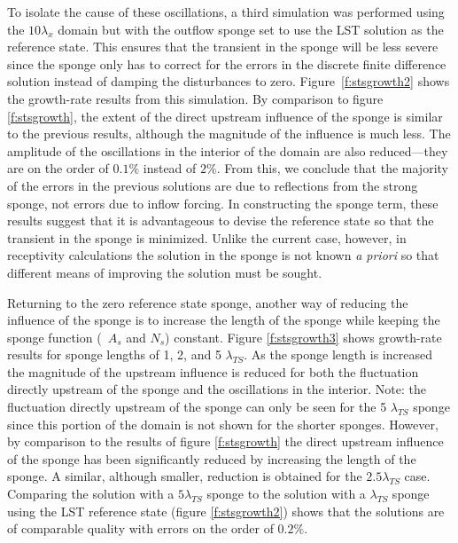 To isolate the cause of these oscillations, a third simulation was performed
using the $10 \lambda_x$ domain but with the outflow sponge set to use the LST
solution as the reference state.  This ensures that the transient in the
sponge will be less severe since the sponge only has to correct for the errors
in the discrete finite difference solution instead of damping the disturbances
to zero.  Figure~\ref{f:stsgrowth2} shows the growth-rate results from this
simulation.  By comparison to figure \ref{f:stsgrowth}, the extent of the
direct upstream influence of the sponge is similar to the previous results,
although the magnitude of the influence is much less.  The amplitude of the
oscillations in the interior of the domain are also reduced---they are on the
order of $0.1\%$ instead of $2\%$.  From this, we conclude that the majority
of the errors in the previous solutions are due to reflections from the strong
sponge, not errors due to inflow forcing.  In constructing the sponge term,
these results suggest that it is advantageous to devise the reference state so
that the transient in the sponge is minimized.  Unlike the current case,
however, in receptivity calculations the solution in the sponge is not known
{\it a priori} so that different means of improving the solution must be
sought.

Returning to the zero reference state sponge, another way of reducing the
influence of the sponge is to increase the length of the sponge while keeping
the sponge function (\ie\ $A_s$ and $N_s$) constant.  Figure
\ref{f:stsgrowth3} shows growth-rate results for sponge lengths of 1, 2, and 5
$\lambda_{TS}$.  As the sponge length is increased the magnitude of the
upstream influence is reduced for both the fluctuation directly upstream of
the sponge and the oscillations in the interior.  Note: the fluctuation
directly upstream of the sponge can only be seen for the 5 $\lambda_{TS}$
sponge since this portion of the domain is not shown for the shorter sponges.
However, by comparison to the results of figure \ref{f:stsgrowth} the direct
upstream influence of the sponge has been significantly reduced by increasing
the length of the sponge.  A similar, although smaller, reduction is obtained
for the $2.5\lambda_{TS}$ case.  Comparing the solution with a $5\lambda_{TS}$
sponge to the solution with a $\lambda_{TS}$ sponge using the LST reference
state (figure \ref{f:stsgrowth2}) shows that the solutions are of comparable
quality with errors on the order of $0.2\%$.


